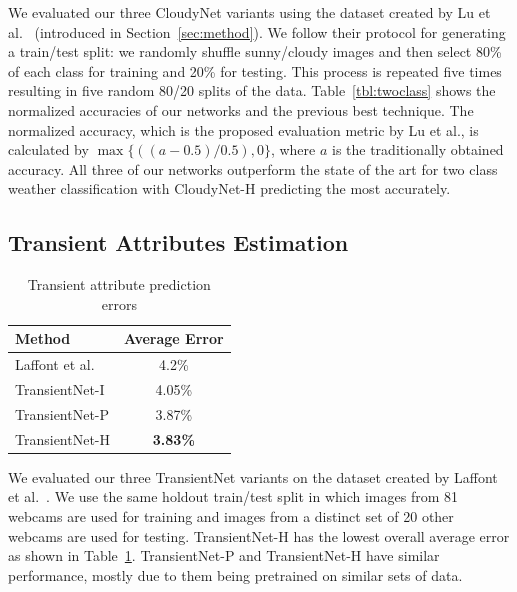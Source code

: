 \documentclass[10pt,twocolumn,letterpaper]{article}
\newcommand{\tblref}[1]{Table~\ref{tbl:#1}}
\begin{document}
We evaluated our three CloudyNet variants using the dataset created by Lu et
al.~\cite{lutwoclass} (introduced in Section~\ref{sec:method}). 
We follow their protocol for
generating a train/test split: we randomly shuffle sunny/cloudy images
and then select 80\% of each class for training and 20\% for testing.
This process is repeated five times resulting in five random 80/20
splits of the data. 
\tblref{twoclass} shows the normalized accuracies of our networks and
the previous best technique.  The normalized
accuracy, which is the proposed evaluation metric by Lu et al., is calculated by $ \max\{((a - 0.5) / 0.5), 0\} $, where $a$ is the
traditionally obtained accuracy. All three of our networks outperform the state
of the art for two class weather classification with CloudyNet-H predicting the
most accurately.


\subsection{Transient Attributes Estimation}

\begin{table}[t]
	\centering
	\caption{Transient attribute prediction errors}
	\begin{tabular}{ | l | c | }
		\hline
			Method & Average Error \\ \hline \hline
			Laffont et al.~\cite{Laffont14}& 4.2\% \\ \hline
			TransientNet-I & 4.05\% \\ \hline
			TransientNet-P & 3.87\% \\ \hline
			TransientNet-H & \textbf{3.83\%} \\ 
		\hline
	\end{tabular}
	\label{tbl:transient}
\end{table}

We evaluated our three TransientNet variants on the dataset created by Laffont
et al.~\cite{Laffont14}.  We use the same holdout train/test split in which
images from 81 webcams are used for training and images from a distinct set of
20 other webcams are used for testing. 
TransientNet-H has the lowest overall average error as shown in
\tblref{transient}.  TransientNet-P and TransientNet-H have similar
performance, mostly due to them being pretrained on similar sets of data.
\end{document}
